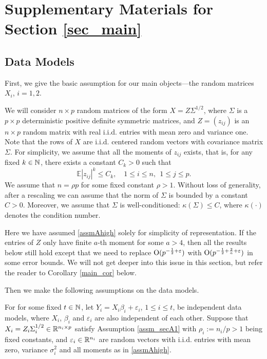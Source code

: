 
\section{Supplementary Materials for Section \ref{sec_main}}\label{app_proof_sec3}

\subsection{Data Models}\label{app_data_model}
First, we give the basic assumption for our main objects---the random matrices $X_i$, $i=1,2$.

\begin{assumption}\label{assm_secA1}
We will consider $n\times p$ random matrices of the form $X=Z\Sigma^{1/2}$, where $\Sigma$  is a $p\times p$ deterministic positive definite symmetric matrices, and $Z=(z_{ij})$ is an $n\times p$ random matrix with real i.i.d. entries with mean zero and variance one. Note that the rows of $X$ are i.i.d. centered random vectors with covariance matrix $\Sigma$. For simplicity, we assume that all the moments of $z_{ij}$ exists, that is, for any fixed $k\in \mathbb{N}$, there exists a constant $C_k>0$ such that
\begin{equation}\label{assmAhigh}
\mathbb{E} |z_{ij}|^k \le C_k ,\quad 1\le i \le n, \ \ 1\le j \le p.
\end{equation}
 We assume that $n=\rho p$ for some fixed constant $\rho>1$. Without loss of generality, after a rescaling we can assume that the norm of $\Sigma$ is bounded by a constant $C>0$. Moreover, we assume that $\Sigma$ is well-conditioned: $\kappa(\Sigma)\le C$, where $\kappa(\cdot)$ denotes the condition number.
\end{assumption}
Here we have assumed \eqref{assmAhigh} solely for simplicity of representation. If the entries of $Z$ only have finite $a$-th moment for some $a>4$, then all the results below still hold except that we need to replace $\operatorname{O}(p^{-\frac12+{\varepsilon}})$ with $\operatorname{O}( p^{-\frac12+\frac2a +\varepsilon})$ in some error bounds. We will not get deeper into this issue in this section, but refer the reader to Corollary \ref{main_cor} below.

Then we make the following assumptions on the data models.
\begin{assumption}\label{assm_secA2}
For for some fixed $t\in \mathbb{N}$, let $Y_i = X_i\beta_i + \varepsilon_i$, $1\le i \le t$, be independent data models, where $X_i$, $\beta_i$ and $\varepsilon_i$ are also independent of each other. Suppose that $X_i=Z_i\Sigma_i^{1/2}\in \mathbb{R}^{n_i\times p}$ satisfy Assumption \ref{assm_secA1} with $\rho_i:=n_i/p>1$ being fixed constants, and ${\varepsilon}_i\in \mathbb{R}^{n_i}$ are random vectors with i.i.d. entries with mean zero, variance $\sigma_i^2$ and all moments as in \eqref{assmAhigh}.
\end{assumption}

